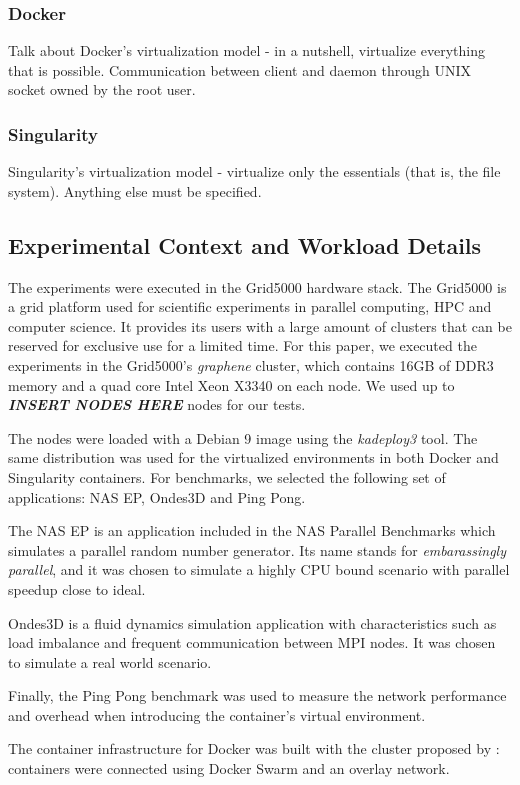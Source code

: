 \documentclass[12pt]{article}
\begin{document}
\subsubsection{Docker}
Talk about Docker's virtualization model - in a nutshell, virtualize
everything that is possible. Communication between client and daemon
through UNIX socket owned by the root user.

\subsubsection{Singularity}
Singularity's virtualization model - virtualize only the essentials
(that is, the file system). Anything else must be specified.

\subsection{Experimental Context and Workload Details}
The experiments were executed in the Grid5000 hardware stack. The
Grid5000 is a grid platform used for scientific experiments in
parallel computing, HPC and computer science. It provides its users
with a large amount of clusters that can be reserved for exclusive use
for a limited time. For this paper, we executed the experiments in the
Grid5000's \textit{graphene} cluster, which contains 16GB of DDR3
memory and a quad core Intel Xeon X3340 on each node. We used up to
\textit{\textbf{INSERT NODES HERE}} nodes for our tests.

The nodes were loaded with a Debian 9 image using the
\textit{kadeploy3} tool. The same distribution was used for the
virtualized environments in both Docker and Singularity
containers. For benchmarks, we selected the following set of
applications: NAS EP, Ondes3D and Ping Pong.

The NAS EP is an application included in the NAS Parallel Benchmarks
which simulates a parallel random number generator. Its name stands
for \textit{embarassingly parallel}, and it was chosen to simulate a
highly CPU bound scenario with parallel speedup close to ideal.

Ondes3D is a fluid dynamics simulation application with
characteristics such as load imbalance and frequent communication
between MPI nodes. It was chosen to simulate a real world scenario.

Finally, the Ping Pong benchmark was used to measure the network
performance and overhead when introducing the container's virtual
environment.

The container infrastructure for Docker was built with the cluster
proposed by \cite{7868429}: containers were connected using Docker
Swarm and an overlay network.
\end{document}
